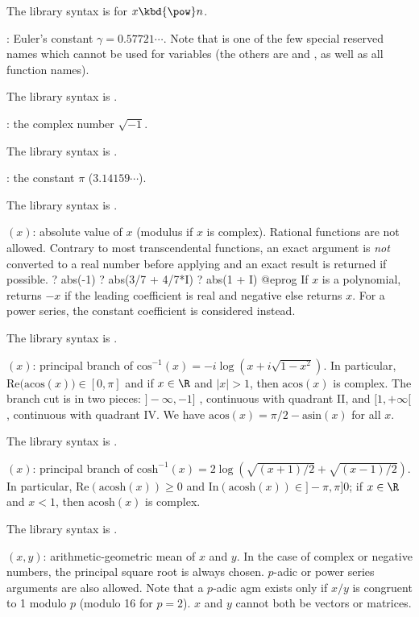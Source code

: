 The library syntax is 
for $x\hbox{\kbd{\pow}}n$.


: \label{se:Euler}Euler's constant $\gamma=0.57721\cdots$. Note that
 is one of the few special reserved names which cannot be used for
variables (the others are  and , as well as all function
names).

The library syntax is .

: \label{se:I}the complex number $\sqrt{-1}$.

The library syntax is .

: \label{se:Pi}the constant $\pi$ ($3.14159\cdots$).

The library syntax is .

$(x)$: \label{se:abs}absolute value of $x$ (modulus if $x$ is complex).
Rational functions are not allowed. Contrary to most transcendental
functions, an exact argument is \emph{not} converted to a real number before
applying  and an exact result is returned if possible.
\bprog
? abs(-1)
? abs(3/7 + 4/7*I)
? abs(1 + I)
@eprog\noindent
If $x$ is a polynomial, returns $-x$ if the leading coefficient is
real and negative else returns $x$. For a power series, the constant
coefficient is considered instead.

The library syntax is .

$(x)$: \label{se:acos}principal branch of $\text{cos}^{-1}(x) = -i \log (x + i\sqrt{1-x^2})$.
In particular, $\text{Re(acos}(x))\in [0,\pi]$ and if $x\in \R$ and $|x|>1$,
then $\text{acos}(x)$ is complex. The branch cut is in two pieces:
$]-\infty,-1]$ , continuous with quadrant II, and $[1,+\infty[$, continuous
with quadrant IV. We have $\text{acos}(x) = \pi/2 - \text{asin}(x)$ for all
$x$.

The library syntax is .

$(x)$: \label{se:acosh}principal branch of $\text{cosh}^{-1}(x) = 2
 \log(\sqrt{(x+1)/2} + \sqrt{(x-1)/2})$. In particular,
$\text{Re}(\text{acosh}(x))\geq 0$ and
$\text{In}(\text{acosh}(x))\in ]-\pi,\pi]0$; if $x\in \R$ and $x<1$, then
$\text{acosh}(x)$ is complex.

The library syntax is .

$(x,y)$: \label{se:agm}arithmetic-geometric mean of $x$ and $y$. In the
case of complex or negative numbers, the principal square root is always
chosen. $p$-adic or power series arguments are also allowed. Note that
a $p$-adic agm exists only if $x/y$ is congruent to 1 modulo $p$ (modulo
16 for $p=2$). $x$ and $y$ cannot both be vectors or matrices.

